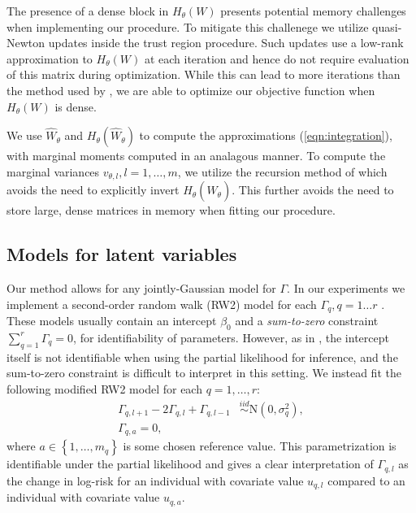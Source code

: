 \documentclass[]{article}
\begin{document}
The presence of a dense block in $H_{\theta}(W)$ presents potential memory challenges when implementing our procedure. To mitigate this challenege we utilize quasi-Newton updates inside the trust region procedure. Such updates use a low-rank approximation to $H_{\theta}(W)$ at each iteration and hence do not require evaluation of this matrix during optimization. While this can lead to more iterations than the method used by \citet{casecross}, we are able to optimize our objective function when $H_{\theta}(W)$ is dense.

We use $\widehat{W}_{\theta}$ and $H_{\theta}(\widehat{W}_{\theta})$ to compute the approximations (\ref{eqn:integration}), with marginal moments computed in an analagous manner. To compute the marginal variances $v_{\theta,l},l = 1,\ldots,m$, we utilize the recursion method of \citet{gmrfmodels} which avoids the need to explicitly invert $H_{\theta}(\widehat{W}_{\theta})$. This further avoids the need to store large, dense matrices in memory when fitting our procedure.

\subsection{Models for latent variables}

Our method allows for any jointly-Gaussian model for $\Gamma$. In our experiments we implement a second-order random walk (RW2) model for each $\Gamma_{q},q = 1\ldots r$ \citep{rw2}. These models usually contain an intercept $\beta_{0}$ and a \emph{sum-to-zero} constraint $\sum_{q=1}^{r}\Gamma_{q} = 0$, for identifiability of parameters. However, as in \citet{casecross}, the intercept itself is not identifiable when using the partial likelihood for inference, and the sum-to-zero constraint is difficult to interpret in this setting. We instead fit the following modified RW2 model for each $q = 1,\ldots,r$:
\begin{equation}\begin{aligned}\label{eqn:rw2}
\Gamma_{q,l+1} - 2\Gamma_{q,l} + \Gamma_{q,l-1} &\overset{iid}{\sim}\text{N}\left( 0,\sigma^{2}_{q}\right), \\
\Gamma_{q,a} = 0,
\end{aligned}\end{equation}
where $a\in\left\lbrace 1,\ldots,m_{q}\right\rbrace$ is some chosen reference value. This parametrization is identifiable under the partial likelihood and gives a clear interpretation of $\Gamma_{q,l}$ as the change in log-risk for an individual with covariate value $u_{q,l}$ compared to an individual with covariate value $u_{q,a}$. 
\end{document}
